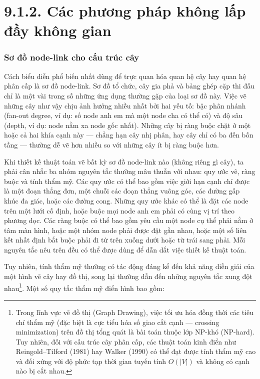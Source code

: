 \documentclass[12pt,a4paper,openany]{book}
\begin{document}
\FloatBarrier
\section*{9.1.2. Các phương pháp không lấp đầy không gian}

\subsubsection{Sơ đồ node-link cho cấu trúc cây}

Cách biểu diễn phổ biến nhất dùng để trực quan hóa quan hệ cây hay quan hệ phân cấp là sơ đồ node-link. Sơ đồ tổ chức, cây gia phả và bảng ghép cặp thi đấu chỉ là một vài trong số những ứng dụng thường gặp của loại sơ đồ này. Việc vẽ những cây như vậy chịu ảnh hưởng nhiều nhất bởi hai yếu tố: bậc phân nhánh (fan-out degree, ví dụ: số node anh em mà một node cha có thể có) và độ sâu (depth, ví dụ: node nằm xa node gốc nhất). Những cây bị ràng buộc chặt ở một hoặc cả hai khía cạnh này --- chẳng hạn cây nhị phân, hay cây chỉ có ba đến bốn tầng --- thường dễ vẽ hơn nhiều so với những cây ít bị ràng buộc hơn.

Khi thiết kế thuật toán vẽ bất kỳ sơ đồ node-link nào (không riêng gì cây), ta phải cân nhắc ba nhóm nguyên tắc thường mâu thuẫn với nhau: quy ước vẽ, ràng buộc và tính thẩm mỹ. Các quy ước có thể bao gồm việc giới hạn cạnh chỉ được là một đoạn thẳng đơn, một chuỗi các đoạn thẳng vuông góc, các đường gấp khúc đa giác, hoặc các đường cong. Những quy ước khác có thể là đặt các node trên một lưới cố định, hoặc buộc mọi node anh em phải có cùng vị trí theo phương dọc. Các ràng buộc có thể bao gồm yêu cầu một node cụ thể phải nằm ở tâm màn hình, hoặc một nhóm node phải được đặt gần nhau, hoặc một số liên kết nhất định bắt buộc phải đi từ trên xuống dưới hoặc từ trái sang phải. Mỗi nguyên tắc nêu trên đều có thể được dùng để dẫn dắt việc thiết kế thuật toán.

Tuy nhiên, tính thẩm mỹ thường có tác động đáng kể đến khả năng diễn giải của một hình vẽ cây hay đồ thị, song lại thường dẫn đến những nguyên tắc xung đột nhau\footnote{Trong lĩnh vực vẽ đồ thị (Graph Drawing), việc tối ưu hóa đồng thời các tiêu chí thẩm mỹ (đặc biệt là cực tiểu hóa số giao cắt cạnh --- crossing minimization) trên đồ thị tổng quát là bài toán thuộc lớp NP-khó (NP-hard). Tuy nhiên, đối với cấu trúc cây phân cấp, các thuật toán kinh điển như Reingold--Tilford (1981) hay Walker (1990) có thể đạt được tính thẩm mỹ cao và đối xứng với độ phức tạp thời gian tuyến tính $O(|V|)$ và không có cạnh nào bị cắt nhau.}. Một số quy tắc thẩm mỹ điển hình bao gồm:
\end{document}
